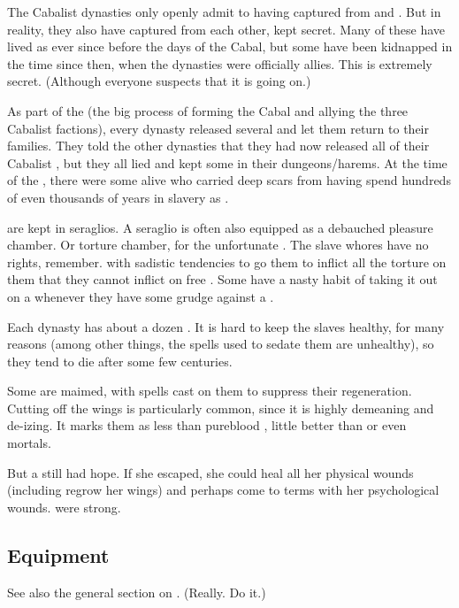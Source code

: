 The Cabalist dynasties only openly admit to having \yurideth{} captured from \Kezerad{} and \Baelzerach. 
But in reality, they also have \yurideth{} captured from each other, kept secret. 
Many of these have lived as \yurideth{} ever since before the days of the Cabal, but some have been kidnapped in the time since then, when the dynasties were officially allies. This is extremely secret. 
(Although everyone suspects that it is going on.)

As part of the  (the big process of forming the Cabal and allying the three Cabalist factions), every dynasty released several \yurideth{} and let them return to their families. They told the other dynasties that they had now released all of their Cabalist \yurideth{}, but they all lied and kept some in their dungeons/harems.
At the time of the \thirdbanewar, there were some \resviel{} alive who carried deep scars from having spend hundreds of even thousands of years in slavery as \yurideth{}.

\Yurideth{} are kept in seraglios. A seraglio is often also equipped as a debauched pleasure chamber. Or torture chamber, for the unfortunate \yurid{}. The slave whores have no rights, remember. \Resphain{} with sadistic tendencies to go them to inflict all the torture on them that they cannot inflict on free \resviel{}. Some \resphain{} have a nasty habit of taking it out on a \yurid{} whenever they have some grudge against a \resvil{}.

Each dynasty has about a dozen \yurideth{}. It is hard to keep the slaves healthy, for many reasons (among other things, the spells used to sedate them are unhealthy), so they tend to die after some few centuries. 

Some \yurideth{} are maimed, with spells cast on them to suppress their regeneration. 
Cutting off the wings is particularly common, since it is highly demeaning and de-\resphan{}izing. It marks them as less than pureblood \resphain{}, little better than \bezedeth{} or even mortals.

But a \yurid{} still had hope. 
If she escaped, she could heal all her physical wounds (including regrow her wings) and perhaps come to terms with her psychological wounds. 
\Resviel{} were strong. 









\subsection{Equipment}
See also the general section on . 
(Really. Do it.)






